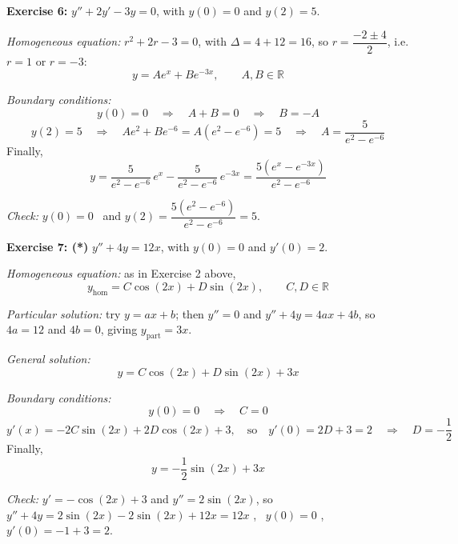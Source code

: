 \documentclass[]{article}
\newcommand{\R}{\mathbb{R}}
\begin{document}
	\textbf{Exercise 6:} $y'' + 2y' - 3y = 0$, with $y(0) = 0$ and $y(2) = 5$.

	\textit{Homogeneous equation:} $r^2 + 2r - 3 = 0$, with $\Delta = 4 + 12 = 16$, so $r = \dfrac{-2 \pm 4}{2}$, i.e. $r = 1$ or $r = -3$:
	$$y = A e^{x} + B e^{-3x}, \qquad A, B \in \R$$

	\textit{Boundary conditions:}
	$$y(0) = 0 \quad \Longrightarrow \quad A + B = 0 \quad \Longrightarrow \quad B = -A$$
	$$y(2) = 5 \quad \Longrightarrow \quad A e^{2} + B e^{-6} = A\left(e^{2} - e^{-6}\right) = 5 \quad \Longrightarrow \quad A = \frac{5}{e^{2} - e^{-6}}$$
	Finally,
	$$y = \frac{5}{e^{2} - e^{-6}} \, e^{x} - \frac{5}{e^{2} - e^{-6}} \, e^{-3x} = \frac{5\left(e^{x} - e^{-3x}\right)}{e^{2} - e^{-6}}$$

	\textit{Check:} $y(0) = 0$ \checkmark \ and $y(2) = \dfrac{5(e^2 - e^{-6})}{e^2 - e^{-6}} = 5$. \checkmark

	\textbf{Exercise 7: (*)} $y'' + 4y = 12x$, with $y(0) = 0$ and $y'(0) = 2$.

	\textit{Homogeneous equation:} as in Exercise 2 above,
	$$y_{\text{hom}} = C \cos(2x) + D \sin(2x), \qquad C, D \in \R$$

	\textit{Particular solution:} try $y = ax + b$; then $y'' = 0$ and $y'' + 4y = 4ax + 4b$, so $4a = 12$ and $4b = 0$, giving $y_{\text{part}} = 3x$.

	\textit{General solution:}
	$$y = C \cos(2x) + D \sin(2x) + 3x$$

	\textit{Boundary conditions:}
	$$y(0) = 0 \quad \Longrightarrow \quad C = 0$$
	$$y'(x) = -2C \sin(2x) + 2D \cos(2x) + 3, \quad \text{so} \quad y'(0) = 2D + 3 = 2 \quad \Longrightarrow \quad D = -\frac{1}{2}$$
	Finally,
	$$y = -\frac{1}{2} \sin(2x) + 3x$$

	\textit{Check:} $y' = -\cos(2x) + 3$ and $y'' = 2\sin(2x)$, so $y'' + 4y = 2\sin(2x) - 2\sin(2x) + 12x = 12x$ \checkmark, \ $y(0) = 0$ \checkmark, \ $y'(0) = -1 + 3 = 2$. \checkmark
\end{document}
